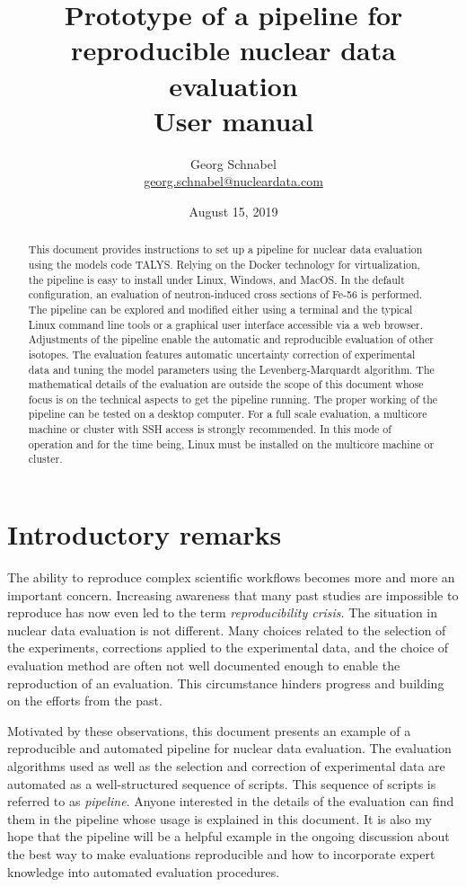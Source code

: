 \documentclass[12pt,a4paper]{scrartcl}
\title{\textbf{Prototype of a pipeline for reproducible nuclear data evaluation} \\[2ex] User manual}
\date{August 15, 2019}
\author{Georg Schnabel \\ \href{mailto:georg.schnabel@nucleardata.com}{georg.schnabel@nucleardata.com}}
\begin{document}
 \maketitle
 \begin{abstract}
This document provides instructions to set up a pipeline for nuclear data evaluation using the models code TALYS.
Relying on the Docker technology for virtualization, the pipeline is easy to install under Linux, Windows, and MacOS.
In the default configuration, an evaluation of neutron-induced cross sections of Fe-56 is performed.
The pipeline can be explored and modified either using a terminal and the typical Linux command line tools or a graphical user interface accessible via a web browser.
Adjustments of the pipeline enable the automatic and reproducible evaluation of other isotopes.
The evaluation features automatic uncertainty correction of experimental data and tuning the model parameters using the Levenberg-Marquardt algorithm.
The mathematical details of the evaluation are outside the scope of this document whose focus is on the technical aspects to get the pipeline running.
The proper working of the pipeline can be tested on a desktop computer.
For a full scale evaluation, a multicore machine or cluster with SSH access is strongly recommended.
In this mode of operation and for the time being, Linux must be installed on the multicore machine or cluster.
 \end{abstract} 
 \newpage
 \tableofcontents
 \newpage 

 \section{Introductory remarks}
 The ability to reproduce complex scientific workflows becomes more and more an important concern.
 Increasing awareness that many past studies are impossible to reproduce has now even led to the term \textit{reproducibility crisis}.
 The situation in nuclear data evaluation is not different.
 Many choices related to the selection of the experiments, corrections applied to the experimental data, and the choice of evaluation method are often not well documented enough to enable the reproduction of an evaluation.
 This circumstance hinders progress and building on the efforts from the past.
 
 Motivated by these observations, this document presents an example of a reproducible and automated pipeline for nuclear data evaluation.
 The evaluation algorithms used as well as the selection and correction of experimental data are automated as a well-structured sequence of scripts.
 This sequence of scripts is referred to as \textit{pipeline}.
 Anyone interested in the details of the evaluation can find them in the pipeline whose usage is explained in this document.
 It is also my hope that the pipeline will be a helpful example in the ongoing discussion about the best way to make evaluations reproducible and how to incorporate expert knowledge into automated evaluation procedures.
 
\end{document}

